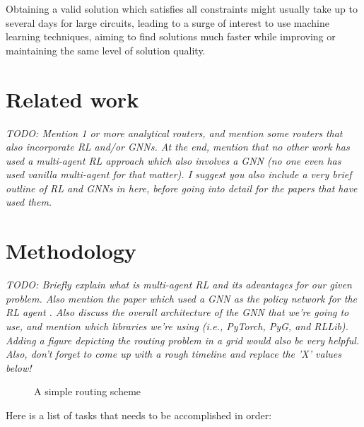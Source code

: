 \documentclass[letterpaper]{article}
\begin{document}
    Obtaining a valid solution which satisfies all constraints might usually take up to several days for large circuits, leading to a surge of interest to use machine learning techniques, aiming to find solutions much faster while improving or maintaining the same level of solution quality.


\section{Related work}


    {\it TODO: Mention 1 or more analytical routers, and mention some routers that also incorporate RL and/or GNNs. At the end, mention that no other work has used a multi-agent RL approach which also involves a GNN (no one even has used vanilla multi-agent for that matter). I suggest you also include a very brief outline of RL and GNNs in here, before going into detail for the papers that have used them.}
    
    
\section{Methodology}
\label{method}


    {\it TODO: Briefly explain what is multi-agent RL and its advantages for our given problem. Also mention the paper which used a GNN as the policy network for the RL agent \cite{Almasan2022}. Also discuss the overall architecture of the GNN that we're going to use, and mention which libraries we're using (i.e., PyTorch, PyG, and RLLib). Adding a figure depicting the routing problem in a grid would also be very helpful. \\
    Also, don't forget to come up with a rough timeline and replace the 'X' values below!}  \\
    
    \begin{figure}[htb]
        \centering
        \fbox{\rule[-.5cm]{0cm}{4cm} \rule[-.5cm]{4cm}{0cm}}
        \caption{A simple routing scheme}
    \end{figure}
    
    Here is a list of tasks that needs to be accomplished in order:
    
\end{document}
